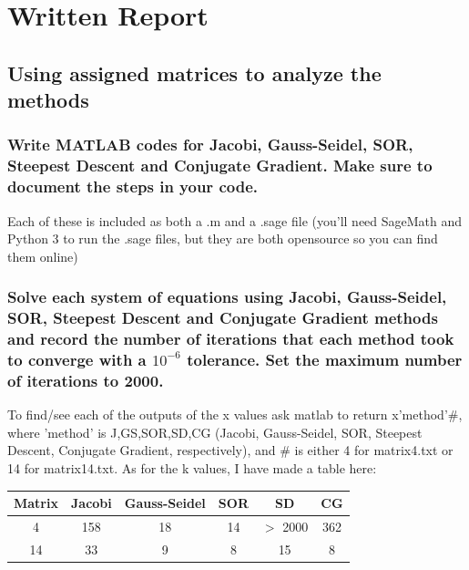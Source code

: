 \documentclass{article}
\title{Numerical Project #1}
\author{Ross Hart}
\date{March 5, 2020}
\begin{document}
\maketitle

\section{Written Report}
\subsection{Using assigned matrices to analyze the methods}
\subsubsection{Write MATLAB codes for Jacobi, Gauss-Seidel, SOR, Steepest Descent and Conjugate Gradient.
Make sure to document the steps in your code.}
Each of these is included as both a .m and a .sage file (you'll need SageMath and Python 3 to run the .sage files, but they are both opensource so you can find them online)
\subsubsection{Solve each system of equations using Jacobi, Gauss-Seidel, SOR, Steepest Descent and Conjugate Gradient methods and record the number of iterations that each method took to converge with a $10^{−6}$ tolerance. Set the maximum number of iterations to 2000.}
To find/see each of the outputs of the x values ask matlab to return x'method'\#, where 'method' is J,GS,SOR,SD,CG (Jacobi, Gauss-Seidel, SOR, Steepest Descent, Conjugate Gradient, respectively), and \# is either 4 for matrix4.txt or 14 for matrix14.txt. As for the k values, I have made a table here:
\begin{center}
 \begin{tabular}{||c | c | c | c | c | c ||} 
 \hline
 Matrix & Jacobi & Gauss-Seidel & SOR & SD & CG \\ [0.5ex] 
 \hline\hline
 4 & 158 & 18 & 14 & $>$ 2000 & 362 \\ 
 \hline
 14 & 33 & 9 & 8 & 15 & 8 \\ [1ex] 
 \hline
\end{tabular}
\end{center}
\end{document}
